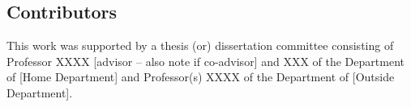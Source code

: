 

\begin{contributors}



%
%
% 
%
%
%
%
%

\subsection*{Contributors}
This work was supported by a thesis (or) dissertation committee consisting of Professor XXXX [advisor -- also note if co-advisor] and XXX of the Department of [Home Department] and Professor(s) XXXX of the Department of [Outside Department].


\end{contributors}
